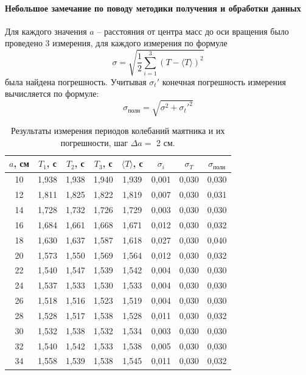 \documentclass[a4paper,12pt]{article}
\begin{document}
	\paragraph{Небольшое замечание по поводу методики получения и обработки данных}
	Для каждого значения $a$ -- расстояния от центра масс до оси вращения было проведено 3 измерения, для каждого измерения по формуле
	\[
	\sigma=\sqrt{\frac{1}{2}\sum_{i=1}^3 (T-\langle T \rangle)^2}
	\]
	была найдена погрешность. Учитывая $\sigma_t'$ конечная погрешность измерения вычисляется по формуле:
	\[
	\sigma_{\text{полн}}=\sqrt{\sigma^2+\sigma_t'^2}
	\]
	\vspace{-10mm}
	\begin{table}[H]
		\centering
		\caption{Результаты измерения периодов колебаний маятника и их погрешности, шаг $\Delta a = $ 2 см.}
		\vspace{2mm}
		\begin{tabular}{|c|c|c|c|c|c|c|c|}
			\hline
			$a$, см & $T_1$, с & $T_2$, с & $T_3$, с & $\langle T \rangle$, с & $\sigma_i$ & $\sigma_T$ & $\sigma_{\text{полн}}$ \\
			\hline
			10 & 1,938 & 1,938 & 1,940 & 1,939 & 0,001 & 0,030 & 0,030 \\
			\hline
			12 & 1,811 & 1,825 & 1,822 & 1,819 & 0,007 & 0,030 & 0,031 \\
			\hline
			14 & 1,728 & 1,732 & 1,726 & 1,729 & 0,003 & 0,030 & 0,030 \\
			\hline
			16 & 1,684 & 1,661 & 1,668 & 1,671 & 0,012 & 0,030 & 0,032 \\
			\hline
			18 & 1,630 & 1,637 & 1,587 & 1,618 & 0,027 & 0,030 & 0,040 \\
			\hline
			20 & 1,573 & 1,550 & 1,569 & 1,564 & 0,012 & 0,030 & 0,032 \\
			\hline
			22 & 1,540 & 1,547 & 1,539 & 1,542 & 0,004 & 0,030 & 0,030 \\
			\hline
			24 & 1,537 & 1,533 & 1,530 & 1,533 & 0,004 & 0,030 & 0,030 \\
			\hline
			26 & 1,518 & 1,516 & 1,523 & 1,519 & 0,004 & 0,030 & 0,030 \\
			\hline
			28 & 1,528 & 1,517 & 1,538 & 1,528 & 0,011 & 0,030 & 0,032 \\
			\hline
			30 & 1,532 & 1,538 & 1,532 & 1,534 & 0,003 & 0,030 & 0,030 \\
			\hline
			32 & 1,540 & 1,542 & 1,533 & 1,538 & 0,005 & 0,030 & 0,030 \\
			\hline
			34 & 1,558 & 1,539 & 1,538 & 1,545 & 0,011 & 0,030 & 0,032 \\

\end{tabular}
\end{table}
\end{document}
